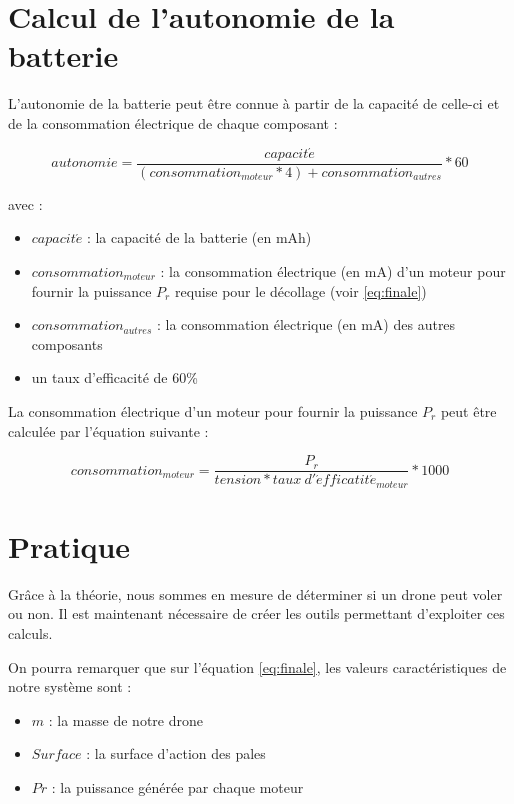 \documentclass[a4paper,10pt]{report}
\begin{document}
      \section{Calcul de l'autonomie de la batterie}
	L'autonomie de la batterie peut être connue à partir de la capacité de 
celle-ci et de la consommation électrique de chaque composant :

	\begin{equation}
	  autonomie = \frac{capacit\acute{e}}{(consommation_{moteur} * 4) + 
consommation_{autres}} * 60
	\end{equation}
	
	avec :
	
	\begin{itemize}
	  \item $capacit\acute{e}$ : la capacité de la batterie (en mAh)
	  \item $consommation_{moteur}$ : la consommation électrique (en mA) 
d'un moteur pour fournir la puissance $P_{r}$ requise pour le décollage (voir 
\ref{eq:finale})
	  \item $consommation_{autres}$ : la consommation électrique (en mA) 
des autres composants
	  \item un taux d'efficacité de 60\%
	\end{itemize}
	
	La consommation électrique d'un moteur pour fournir la puissance 
$P_{r}$ peut être calculée par l'équation suivante :

	\begin{equation}
	  consommation_{moteur} = \frac{P_{r}}{tension * taux \ 
d'\acute{e}fficatit\acute{e}_{moteur}}*1000
	\end{equation}

      \section{Pratique}
	Grâce à la théorie, nous sommes en mesure de déterminer si un drone 
peut voler ou non. Il est maintenant nécessaire de créer les outils permettant 
d'exploiter ces calculs. 

	On pourra remarquer que sur l'équation \ref{eq:finale}, les valeurs 
caractéristiques de notre système sont :
	\begin{itemize}
	  \item $m$ : la masse de notre drone
	  \item $Surface$ : la surface d'action des pales
	  \item $Pr$ : la puissance générée par chaque moteur
	\end{itemize}
	
\end{document}
